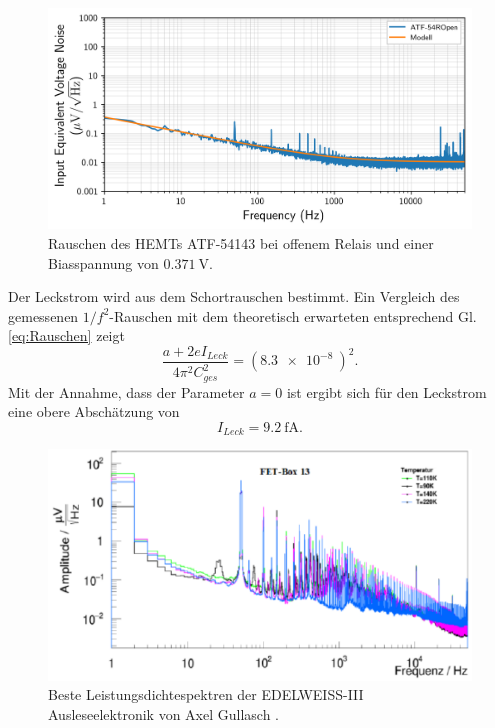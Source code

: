 \begin{figure}[!b]
\begin{center}
\includegraphics[width=\textwidth]{./fig/Rauschen/F54ROpen.png}
\vspace{-0.5cm}
\caption{Rauschen des HEMTs  ATF-54143 bei offenem Relais und einer Biasspannung von $\SI{0.371}{\volt}$.}
\label{fig:54ROpen}
\end{center}
\end{figure}

Der Leckstrom wird aus dem Schortrauschen bestimmt.
Ein Vergleich des gemessenen $1/f^2$-Rauschen mit dem theoretisch erwarteten entsprechend Gl. \ref{eq:Rauschen} zeigt
\begin{equation}
\frac{a + 2eI_{Leck}}{4\pi^2C^2_{ges}} = (\SI{8.3e-8}{})^2.
\end{equation}
Mit der Annahme, dass der Parameter $a=0$ ist ergibt sich für den Leckstrom eine obere Abschätzung von
\begin{equation}
I_{Leck} = \SI{9.2}{\femto\ampere}.
\end{equation}

\begin{figure}[!b]
\begin{center}
\includegraphics[width=\textwidth]{./fig/Rauschen/GullaschRauschen.pdf}
\vspace{-0.5cm}
\caption{Beste Leistungsdichtespektren der EDELWEISS-III Ausleseelektronik von Axel Gullasch \cite{Gullasch2015}.}
\label{fig:EDW}
\end{center}
\end{figure}